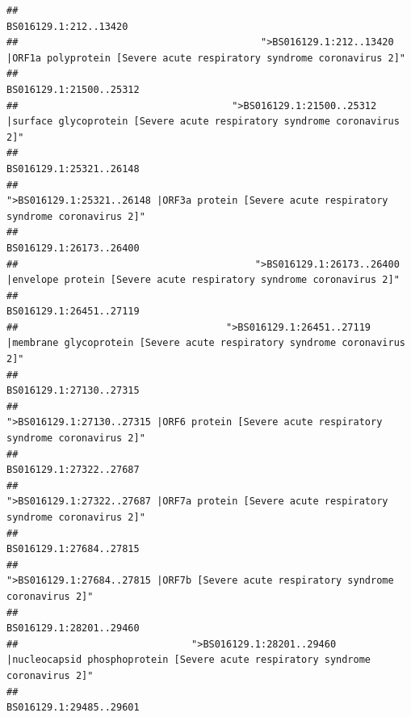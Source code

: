 \documentclass[
]{article}
\begin{document}
\begin{verbatim}
##                                                                                                                  BS016129.1:212..13420 
##                                          ">BS016129.1:212..13420 |ORF1a polyprotein [Severe acute respiratory syndrome coronavirus 2]" 
##                                                                                                                BS016129.1:21500..25312 
##                                     ">BS016129.1:21500..25312 |surface glycoprotein [Severe acute respiratory syndrome coronavirus 2]" 
##                                                                                                                BS016129.1:25321..26148 
##                                            ">BS016129.1:25321..26148 |ORF3a protein [Severe acute respiratory syndrome coronavirus 2]" 
##                                                                                                                BS016129.1:26173..26400 
##                                         ">BS016129.1:26173..26400 |envelope protein [Severe acute respiratory syndrome coronavirus 2]" 
##                                                                                                                BS016129.1:26451..27119 
##                                    ">BS016129.1:26451..27119 |membrane glycoprotein [Severe acute respiratory syndrome coronavirus 2]" 
##                                                                                                                BS016129.1:27130..27315 
##                                             ">BS016129.1:27130..27315 |ORF6 protein [Severe acute respiratory syndrome coronavirus 2]" 
##                                                                                                                BS016129.1:27322..27687 
##                                            ">BS016129.1:27322..27687 |ORF7a protein [Severe acute respiratory syndrome coronavirus 2]" 
##                                                                                                                BS016129.1:27684..27815 
##                                                    ">BS016129.1:27684..27815 |ORF7b [Severe acute respiratory syndrome coronavirus 2]" 
##                                                                                                                BS016129.1:28201..29460 
##                              ">BS016129.1:28201..29460 |nucleocapsid phosphoprotein [Severe acute respiratory syndrome coronavirus 2]" 
##                                                                                                                BS016129.1:29485..29601 

\end{verbatim}
\end{document}
